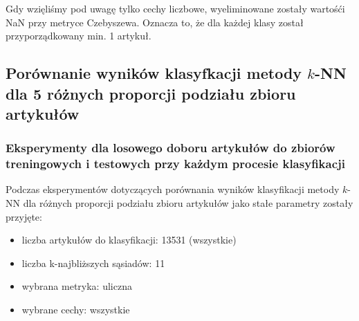 \documentclass{classrep}
\begin{document}
Gdy wzięliśmy pod uwagę tylko cechy liczbowe, wyeliminowane zostały wartośći NaN przy metryce Czebyszewa. Oznacza to, że dla każdej klasy został przyporządkowany min. 1 artykuł.
\\

\subsection{Porównanie wyników klasyfkacji metody $k$-NN dla 5 różnych proporcji podziału zbioru artykułów}
\subsubsection{Eksperymenty dla losowego doboru artykułów do zbiorów treningowych i testowych przy każdym procesie klasyfikacji}
Podczas eksperymentów dotyczących porównania wyników klasyfikacji metody $k$-NN dla różnych proporcji podziału zbioru artykułów jako stałe parametry zostały przyjęte:
\begin{itemize}
    \item liczba artykułów do klasyfikacji: 13531 (wszystkie)
    \item liczba k-najbliższych sąsiadów: 11 
    \item wybrana metryka: uliczna
    \item wybrane cechy: wszystkie
\end{itemize}
\end{document}
